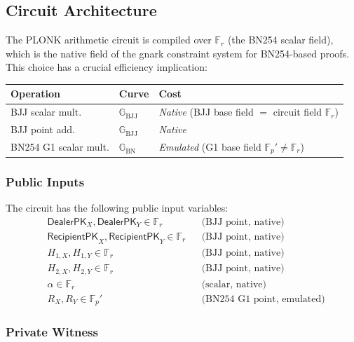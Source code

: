 \documentclass[11pt,a4paper]{article}
\newcommand{\F}{\mathbb{F}}
\newcommand{\G}{\mathbb{G}}
\newcommand{\Gbj}{\G_{\mathrm{BJJ}}}
\newcommand{\Gbn}{\G_{\mathrm{BN}}}
\newcommand{\Fr}{\F_r}
\newcommand{\Fp}{\F_p}
\begin{document}
\subsection{Circuit Architecture}
\label{sec:circuit}

The PLONK arithmetic circuit is compiled over $\Fr$ (the BN254 scalar field),
which is the native field of the gnark constraint system for BN254-based
proofs. This choice has a crucial efficiency implication:

\begin{center}
\renewcommand{\arraystretch}{1.3}
\begin{tabular}{@{}lll@{}}
\toprule
\textbf{Operation} & \textbf{Curve} & \textbf{Cost} \\
\midrule
BJJ scalar mult. & $\Gbj$ & \emph{Native} (BJJ base field $=$ circuit field $\Fr$) \\
BJJ point add. & $\Gbj$ & \emph{Native} \\
BN254 G1 scalar mult. & $\Gbn$ & \emph{Emulated} (G1 base field $\Fp' \ne \Fr$) \\
\bottomrule
\end{tabular}
\end{center}

\subsubsection{Public Inputs}

The circuit has the following public input variables:
\begin{align}
  &\mathsf{DealerPK}_X, \mathsf{DealerPK}_Y \in \Fr
    &&\text{(BJJ point, native)} \label{eq:pub-dealerpk} \\
  &\mathsf{RecipientPK}_X, \mathsf{RecipientPK}_Y \in \Fr
    &&\text{(BJJ point, native)} \label{eq:pub-recipientpk} \\
  &H_{1,X}, H_{1,Y} \in \Fr
    &&\text{(BJJ point, native)} \label{eq:pub-h1} \\
  &H_{2,X}, H_{2,Y} \in \Fr
    &&\text{(BJJ point, native)} \label{eq:pub-h2} \\
  &\alpha \in \Fr
    &&\text{(scalar, native)} \label{eq:pub-alpha} \\
  &R_X, R_Y \in \Fp'
    &&\text{(BN254 G1 point, emulated)} \label{eq:pub-r}
\end{align}

\subsubsection{Private Witness}
\end{document}

